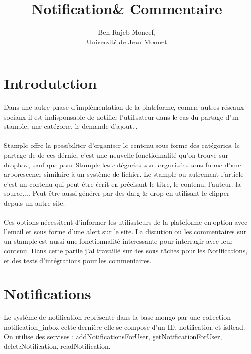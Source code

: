 \documentclass[12pt,oneside,a4paper]{article}
\title{Notification\& Commentaire\\}
\author{Ben Rajeb Moncef,\\
        Université de Jean Monnet}
\begin{document}
\maketitle
\tableofcontents
\maketitle
\newpage
\section{Introdutction}
\paragraph{}
Dans une autre phase d'implémentation de la plateforme, comme autres réseaux sociaux il est indisponsable de notifier l'utilisateur dans le cas du partage d'un stample, une catégorie, le demande d'ajout...
\paragraph{}
Stample offre la possibiliter d'organiser le contenu sous forme des catégories, le partage de de ces dérnier c'est une nouvelle fonctionnalité qu'on trouve sur dropbox, sauf que pour Stample les catégories sont organisées sous forme d'une arborescence similaire à un système de fichier.
\newline
Le stample ou autrement l'article c'est un contenu qui peut être écrit en précisant le titre, le contenu, l'auteur, la source....
Peut être aussi générer par des darg \& drop en utilisant le clipper depuis un autre site.
\paragraph{}
Ces options nécessitent d'informer les utilisateurs de la plateforme en option avec l'email et sous forme d'une alert sur le site.
\newline
La discution ou les commentaires sur un stample est aussi une fonctionnalité interessante pour interragir avec leur contenu.
Dans cette partie j'ai travaillé sur des sous tâches pour les Notifications, et des tests d'intégrations pour les commentaires.
\section{Notifications}
Le systéme de notification représente dans la base mongo par une collection notification\_inbox cette dernière elle se compose d'un ID, notification et isRead.
On utilise des servises : addNotificationsForUser, getNotificationForUser, deleteNotification, readNotification.
\end{document}
